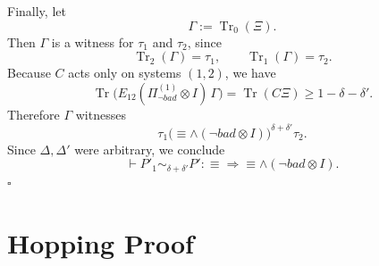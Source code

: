 \documentclass{report}
\theoremstyle{defn_style}
\begin{document}
Finally, let
\[
\Gamma:=\operatorname{Tr}_0(\Xi).
\]
Then $\Gamma$ is a witness for $\tau_1$ and $\tau_2$, since
\[
\operatorname{Tr}_2(\Gamma)=\tau_1,
\qquad
\operatorname{Tr}_1(\Gamma)=\tau_2.
\]
Because $C$ acts only on systems $(1,2)$, we have
\[
\operatorname{Tr}\bigl(E_{12}(\Pi_{\neg bad}^{(1)}\otimes I)\,\Gamma\bigr)
=
\operatorname{Tr}(C\Xi)
\ge 1-\delta-\delta'.
\]
Therefore $\Gamma$ witnesses
\[
\tau_1 \mathrel{\bigl(\equiv \wedge (\neg bad\otimes I)\bigr)^{\delta+\delta'}} \tau_2.
\]
Since $\Delta,\Delta'$ were arbitrary, we conclude
\[
\vdash P'_1 \sim_{\delta+\delta'} P' : \equiv \Longrightarrow \equiv \wedge (\neg bad \otimes I).
\]
\hfill$\square$


\section{Hopping Proof}
\end{document}
